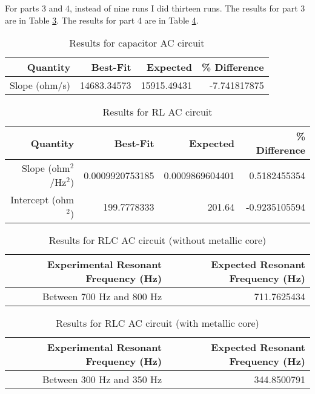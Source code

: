For parts 3 and 4, instead of nine runs I did thirteen runs. The results for part 3 are in Table \ref{table.results.RLC}. The results for part 4 are in Table \ref{table.results.RLCcore}.
\begin{table}[ht!]
	\begin{center}
		\begin{tabular}{|r|r|r|r|}
			\hline
			Quantity & Best-Fit & Expected & \% Difference \\
			\hline
			Slope (ohm/s) & 14683.34573 & 15915.49431 & -7.741817875 \\
			\hline
		\end{tabular}
	\end{center}
	\caption{Results for capacitor AC circuit}
	\label{table.results.C}
\end{table}
\begin{table}[ht!]
	\begin{center}
		\begin{tabular}{|r|r|r|r|}
			\hline
			Quantity & Best-Fit & Expected & \% Difference \\
			\hline
			Slope (ohm$^{2}$/Hz$^{2}$) & 0.0009920753185 & 0.0009869604401 & 0.5182455354 \\
			Intercept (ohm$^{2}$) & 199.7778333 & 201.64 & -0.9235105594 \\
			\hline
		\end{tabular}
	\end{center}
	\caption{Results for RL AC circuit}
	\label{table.results.RL}
\end{table}
\begin{table}[ht!]
	\begin{center}
		\begin{tabular}{|r|r|}
			\hline
			Experimental Resonant Frequency (Hz) & Expected Resonant Frequency (Hz) \\
			\hline
			Between 700 Hz and 800 Hz & 711.7625434 \\
			\hline
		\end{tabular}
	\end{center}
	\caption{Results for RLC AC circuit (without metallic core)}
	\label{table.results.RLC}
\end{table}
\begin{table}[ht!]
	\begin{center}
		\begin{tabular}{|r|r|}
			\hline
			Experimental Resonant Frequency (Hz) & Expected Resonant Frequency (Hz) \\
			\hline
			Between 300 Hz and 350 Hz & 344.8500791 \\
			\hline
		\end{tabular}
	\end{center}
	\caption{Results for RLC AC circuit (with metallic core)}
	\label{table.results.RLCcore}
\end{table}
